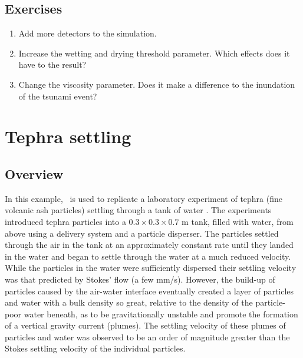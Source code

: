 \subsection{Exercises}
\begin{enumerate}
\item Add more detectors to the simulation.
\item Increase the wetting and drying threshold parameter. Which effects does it have to the result?
\item Change the viscosity parameter. Does it make a difference to the inundation of the tsunami event?
\end{enumerate}



\section{Tephra settling}
\label{sect:tephra_settling}

\subsection{Overview}
In this example, \fluidity\ is used to replicate a laboratory experiment of tephra (fine volcanic ash particles) settling through a tank of water \citep{carey1997}. The \cite{carey1997} experiments introduced tephra particles into a $0.3\times 0.3\times 0.7$ m tank, filled with water, from above using a delivery system and a particle disperser. The particles settled through the air in the tank at an approximately constant rate until they landed in the water and began to settle through the water at a much reduced velocity. While the particles in the water were sufficiently dispersed their settling velocity was that predicted by Stokes' flow (a few mm/s).  However, the build-up of particles caused by the air-water interface eventually created a layer of particles and water with a bulk density so great, relative to the density of the particle-poor water beneath, as to be gravitationally unstable and promote the formation of a vertical gravity current (plumes). The settling velocity of these plumes of particles and water was observed to be an order of magnitude greater than the Stokes settling velocity of the individual particles.

